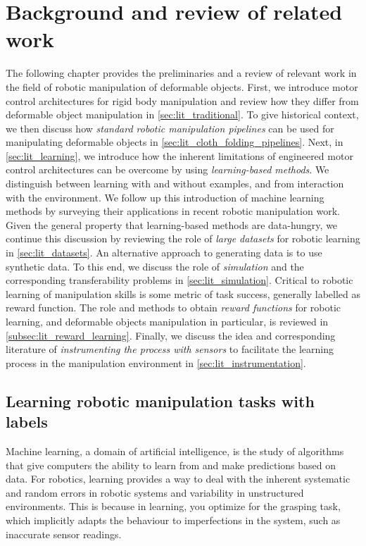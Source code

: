 \documentclass[\home/main.tex]{subfiles}
\begin{document}
\chapter{Background and review of related work} \label{ch:lit}

The following chapter provides the preliminaries and a review of relevant work in the field of robotic manipulation of deformable objects. 
First, we introduce motor control architectures for rigid body manipulation and review how they differ from deformable object manipulation in \cref{sec:lit_traditional}.
To give historical context, we then discuss how \emph{standard robotic manipulation pipelines} can be used for manipulating deformable objects in \cref{sec:lit_cloth_folding_pipelines}.
Next, in \cref{sec:lit_learning}, we introduce how the inherent limitations of engineered motor control architectures can be overcome by using \emph{learning-based methods}. We distinguish between learning with and without examples, and from interaction with the environment.
We follow up this introduction of machine learning methods by surveying their applications in recent robotic manipulation work. Given the general property that learning-based methods are data-hungry, we continue this discussion by reviewing the role of \emph{large datasets} for robotic learning in \cref{sec:lit_datasets}. An alternative approach to generating data is to use synthetic data. To this end, we discuss the role of \emph{simulation} and the corresponding transferability problems in \cref{sec:lit_simulation}. Critical to robotic learning of manipulation skills is some metric of task success, generally labelled as reward function. The role and methods to obtain \emph{reward functions} for robotic learning, and deformable objects manipulation in particular, is reviewed in \cref{subsec:lit_reward_learning}. Finally, we discuss the idea and corresponding literature of \emph{instrumenting the process with sensors} to facilitate the learning process in the manipulation environment in \cref{sec:lit_instrumentation}.






\section{Learning robotic manipulation tasks with labels} \label{subsec:lit_sl}
Machine learning, a domain of artificial intelligence, is the study of algorithms that give computers the ability to learn from and make predictions based on data. For robotics, learning provides a way to deal with the inherent systematic and random errors in robotic systems and variability in unstructured environments. This is because in learning, you optimize for the grasping task, which implicitly adapts the behaviour to imperfections in the system, such as inaccurate sensor readings.
\end{document}
